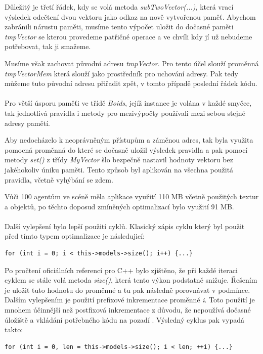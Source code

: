 \documentclass[czech,public,dept460,male,cpdeclaration]{diploma}
\begin{document}
Důležitý je třetí řádek, kdy se volá metoda \textit{subTwoVector(...)}, která vrací výsledek odečtení dvou vektoru jako odkaz na nově vytvořenou paměť. Abychom zabránili nárustu paměti, musíme tento výpočet uložit do dočasné paměti \textit{tmpVector} se kterou provedeme patřičné operace a ve chvíli kdy jí už nebudeme potřebovat, tak ji smažeme.

Musíme však zachovat původní adresu \textit{tmpVector}. Pro tento účel slouží proměnná \\\textit{tmpVectorMem} která slouží jako prostředník pro uchování adresy. Pak tedy můžeme tuto původní adresu přiřadit zpět, v tomto případě poslední řádek kódu.
\\\\
Pro větší úsporu paměťi ve třídě \textit{Boids}, jejíž instance je volána v každé smyčce, tak jednotlivá pravidla i metody pro mezivýpočty používali mezi sebou stejné adresy pamětí.

Aby nedocházelo k neoprávněným přístupům a záměnou adres, tak byla využita pomocná proměnná do které se dočasně uložil výsledek pravidla a pak pomocí metody \textit{set()} z třídy \textit{MyVector} šlo bezpečně nastavil hodnoty vektoru bez jakéhokoliv úniku paměti. Tento způsob byl aplikován na všechna použitá pravidla, včetně vyhýbání se zdem.

Vůči 100 agentům ve scéně měla aplikace využití 110 MB včetně použitých textur a objektů, po těchto doposud zmíněných optimalizací bylo využití 91 MB.
\\\\
Další vylepšení bylo lepší použití cyklů. Klasický zápis cyklu který byl použit před tímto typem optimalizace je následujicí:
\begin{lstlisting}[label=src:classic cycle,caption=Použití klasického cyklu] 
for (int i = 0; i < this->models->size(); i++) {...}
\end{lstlisting}
Po pročtení oficiálních referencí pro C++ \cite{linkToCppReference} bylo zjištěno, že při každé iteraci cyklem se stále volá metoda \textit{size()}, která tento výkon podstatně snižuje. Řešením je uložit tuto hodnotu do proměnné a tu pak  následně porovnávat v podmínce. Dalším vylepšením je použití prefixové inkrementace proměnné \textit{i}. Toto použití je mnohem účinnější než postfixová inkrementace z důvodu, že nepoužívá dočasné úložiště a vkládání potřebného kódu na pozadí \cite{linkToPreIncrementation}. Výsledný cyklus pak vypadá takto:
\begin{lstlisting}[label=src:optimalized cycle,caption=Použití optimalizovaného cyklu] 
for (int i = 0, len = this->models->size(); i < len; ++i) {...}
\end{lstlisting}
\end{document}
